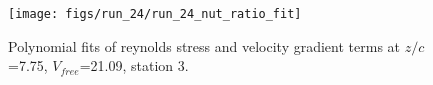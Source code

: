 \begin{figure}[H]
\centering
\texttt{[image: figs/run\_24/run\_24\_nut\_ratio\_fit]}
\caption{Polynomial fits of reynolds stress and velocity gradient terms at $z/c$=7.75, $V_{free}$=21.09, station 3.}
\label{fig:run_24_nut_ratio_fit}
\end{figure}


